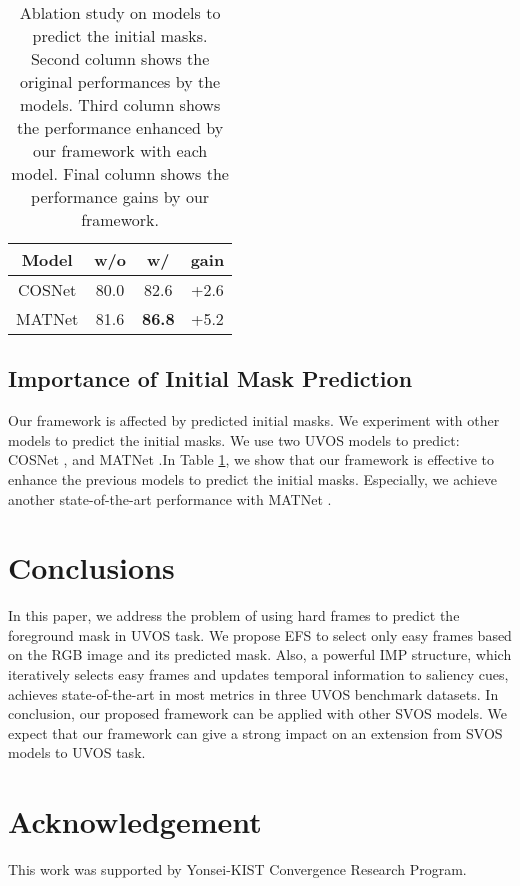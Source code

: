 \documentclass[letterpaper]{article} \usepackage{aaai22}  \usepackage{times}  \usepackage{helvet}  \usepackage{courier}  \usepackage[hyphens]{url}  \usepackage{graphicx} \urlstyle{rm} \def\UrlFont{\rm}  \usepackage{natbib}  \usepackage{caption} \DeclareCaptionStyle{ruled}{labelfont=normalfont,labelsep=colon,strut=off} \frenchspacing  \setlength{\pdfpagewidth}{8.5in}  \setlength{\pdfpageheight}{11in}  \usepackage{algorithm}
\begin{document}
\begin{table}[h]
\centering
\caption{Ablation study on models to predict the initial masks. Second column shows the original performances by the models. Third column shows the performance enhanced by our framework with each model. Final column shows the performance gains by our framework.}
\label{table8}
\begin{tabular}{@{}c|c|c|c@{}}
\toprule
Model  & w/o  & w/   & gain \\ \midrule
COSNet & 80.0 & 82.6 & +2.6  \\
MATNet & 81.6 & \textbf{86.8} & +5.2  \\ \bottomrule
\end{tabular}
\end{table}

\subsection{Importance of Initial Mask Prediction}

Our framework is affected by predicted initial masks. We experiment with other models to predict the initial masks. We use two UVOS models to predict: COSNet \citep{lu2019see}, and MATNet \citep{zhou2020motion}.In Table \ref{table8}, we show that our framework is effective to enhance the previous models to predict the initial masks. Especially, we achieve another state-of-the-art performance with MATNet \citep{zhou2020motion}.

\section{Conclusions}

In this paper, we address the problem of using hard frames to predict the foreground mask in UVOS task. We propose EFS to select only easy frames based on the RGB image and its predicted mask. Also, a powerful IMP structure, which iteratively selects easy frames and updates temporal information to saliency cues, achieves state-of-the-art in most metrics in three UVOS benchmark datasets. In conclusion, our proposed framework can be applied with other SVOS models. We expect that our framework can give a strong impact on an extension from SVOS models to UVOS task. 

\section{Acknowledgement}

This work was supported by Yonsei-KIST Convergence Research Program.


\end{document}
